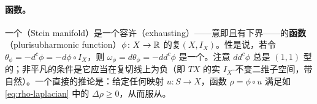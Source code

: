 \paragraph{\trPlurisubharmonic{}函数。}\label{sub:plurisubharmonic-functions}
一个\textbf{\trStein{}\trManifold}（Stein manifold）是一个容许\textbf{\trExhausting}（exhausting）——意即\trProper{}且有下界——的\textbf{\trPlurisubharmonic{}函数}（plurisubharmonic function）$\phi\colon X\to\mathbb{R}$ 的复\trManifold{}$(X,I_X)$。\trPlurisubharmonic{}性是说，若令 $\theta_\phi=-d^c\phi=-d\phi\circ I_X$，则 $\omega_\phi=d\theta_\phi=-dd^c\phi$ 是一个\trKaehler{}\trForm。注意 $dd^c\phi$ 总是 $(1,1)$ 型的；非平凡的条件是它应当在复切线上为负（即 $TX$ 的实 $I_X$-不变二维子空间，带自然\trOrientation）。一个直接的推论是：给定任何\trHolomorphic{}映射 $u\colon S\to X$，函数 $\rho=\phi\circ u$ 满足如 \eqref{eq:rho-laplacian} 中的 $\Delta\rho\ge 0$，从而服从\trMaximumPrinciple。

